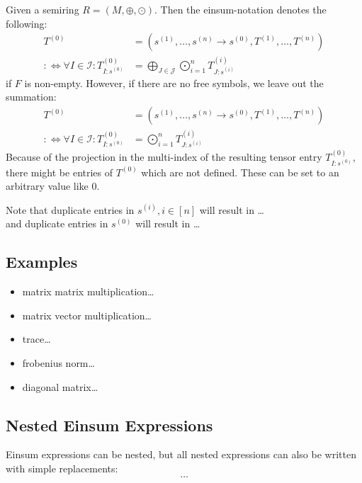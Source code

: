 Given a semiring $R = (M, \oplus, \odot)$. Then the einsum-notation denotes the following:
\begin{align*}
    T^{(0)}                                               & = (s^{(1)},\dots,s^{(n)} \rightarrow s^{(0)}, T^{(1)},\dots,T^{(n)})                   \\
    :\iff \forall I \in \mathcal{I}: T^{(0)}_{I: s^{(0)}} & = \bigoplus\limits_{J \in \mathcal{J}} \bigodot\limits_{i = 1}^{n} T^{(i)}_{J:s^{(i)}}
\end{align*}
if $F$ is non-empty. However, if there are no free symbols, we leave out the summation:
\begin{align*}
    T^{(0)}                                               & = (s^{(1)},\dots,s^{(n)} \rightarrow s^{(0)}, T^{(1)},\dots,T^{(n)}) \\
    :\iff \forall I \in \mathcal{I}: T^{(0)}_{I: s^{(0)}} & = \bigodot\limits_{i = 1}^{n} T^{(i)}_{J:s^{(i)}}
\end{align*}
Because of the projection in the multi-index of the resulting tensor entry $T^{(0)}_{I: s^{(0)}}$, there might be entries of $T^{(0)}$ which are not defined.
These can be set to an arbitrary value like 0.

Note that duplicate entries in $s^{(i)}, i \in [n]$ will result in \dots\\
and duplicate entries in $s^{(0)}$ will result in \dots

\subsection{Examples}

\begin{itemize}
    \item matrix matrix multiplication\dots
    \item matrix vector multiplication\dots
    \item trace\dots
    \item frobenius norm\dots
    \item diagonal matrix\dots
\end{itemize}

\subsection{Nested Einsum Expressions}

Einsum expressions can be nested, but all nested expressions can also be written with simple replacements:
$$\dots$$